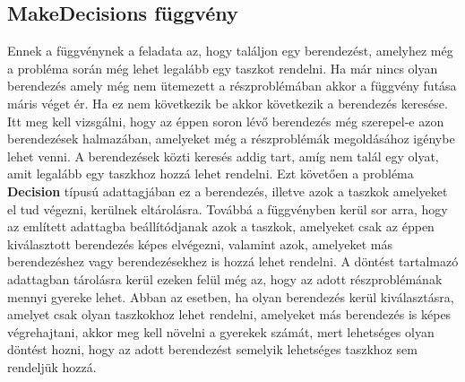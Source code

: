 \subsection{MakeDecisions függvény}
Ennek a függvénynek a feladata az, hogy találjon egy berendezést, amelyhez még a probléma során még lehet legalább egy taszkot rendelni. Ha már nincs olyan berendezés amely még nem ütemezett a részproblémában akkor a függvény futása máris véget ér. Ha ez nem következik be akkor következik a berendezés keresése. Itt meg kell vizsgálni, hogy az éppen soron lévő berendezés még szerepel-e azon berendezések halmazában, amelyeket még a részproblémák megoldásához igénybe lehet venni. A berendezések közti keresés addig tart, amíg nem talál egy olyat, amit legalább egy taszkhoz hozzá lehet rendelni. Ezt követően a probléma \textbf{Decision} típusú adattagjában ez a berendezés, illetve azok a taszkok amelyeket el tud végezni, kerülnek eltárolásra. Továbbá a függvényben kerül sor arra, hogy az említett adattagba beállítódjanak azok a taszkok, amelyeket csak az éppen kiválasztott berendezés képes elvégezni, valamint azok, amelyeket más berendezéshez vagy berendezésekhez is hozzá lehet rendelni. A döntést tartalmazó adattagban tárolásra kerül ezeken felül még az, hogy az adott részproblémának mennyi gyereke lehet. Abban az esetben, ha olyan berendezés kerül kiválasztásra, amelyet csak olyan taszkokhoz lehet rendelni, amelyeket más berendezés is képes végrehajtani, akkor meg kell növelni a gyerekek számát, mert lehetséges olyan döntést hozni, hogy az adott berendezést semelyik lehetséges taszkhoz sem rendeljük hozzá.   
